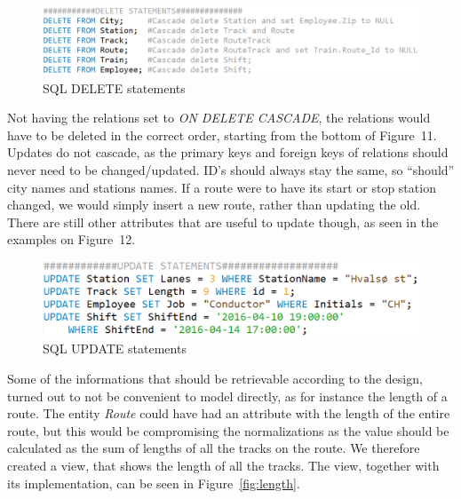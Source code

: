\begin{figure}[ht!]
    \centering
    \includegraphics[width=1\textwidth]{img/DELETE_Statements}
    \caption{SQL DELETE statements}
\end{figure}

Not having the relations set to \emph{ON DELETE CASCADE}, the relations would 
have to be deleted in the correct order, starting from the bottom of Figure~11.
Updates do not cascade, as the primary keys and foreign keys of relations 
should never need to be changed/updated. ID's should always stay the same, so 
``should'' city names and stations names. If a route were to have its start or 
stop station changed, we would simply insert a new route, rather than updating 
the old.
There are still other attributes that are useful to update though, as seen in 
the examples on Figure~12.

\begin{figure}[ht!]
    \centering
    \includegraphics[width=1\textwidth]{img/UPDATE_Statements}
    \caption{SQL UPDATE statements}
\end{figure}

Some of the informations that should be retrievable according to the design, 
turned out to not be convenient to model directly, as for instance the length 
of a route. The entity \emph{Route} could have had an attribute with the length 
of the entire route, but this would be compromising the normalizations as the 
value should be calculated as the sum of lengths of all the tracks on the 
route. We therefore created a view, that shows the length of all the 
tracks. The view, together with its implementation, can be seen in 
Figure~\ref{fig:length}.

